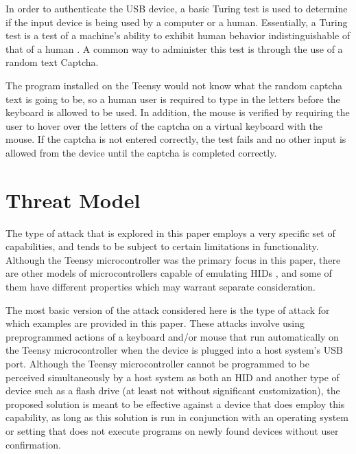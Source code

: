 \documentclass[pagenumbers]{ieee}
\begin{document}
In order to authenticate the USB device, a basic Turing test is used to determine if the input device is being used by a computer or a human. Essentially, a Turing test is a test of a machine's ability to exhibit human behavior indistinguishable of that of a human \cite{turing}. A common way to administer this test is through the use of a random text Captcha. 

The program installed on the Teensy would not know what the random captcha text is going to be, so a human user is required to type in the letters before the keyboard is allowed to be used. In addition, the mouse is verified by requiring the user to hover over the letters of the captcha on a virtual keyboard with the mouse. If the captcha is not entered correctly, the test fails and no other input is allowed from the device until the captcha is completed correctly.


\section{Threat Model}
\label{section:threat}

The type of attack that is explored in this paper employs a very specific set of capabilities, and tends to be subject to certain limitations in functionality. Although the Teensy microcontroller was the primary focus in this paper, there are other models of microcontrollers capable of emulating HIDs  \cite{captcha}, and some of them have different properties which may warrant separate consideration. 

The most basic version of the attack considered here is the type of attack for which examples are provided in this paper. These attacks involve using preprogrammed actions of a keyboard and/or mouse that run automatically on the Teensy microcontroller when the device is plugged into a host system's USB port. Although the Teensy microcontroller cannot be programmed to be perceived simultaneously by a host system as both an HID and another type of device such as a flash drive (at least not without significant customization), the proposed solution is meant to be effective against a device that does employ this capability, as long as this solution is run in conjunction with an operating system or setting that does not execute programs on newly found devices without user confirmation.
\end{document}
